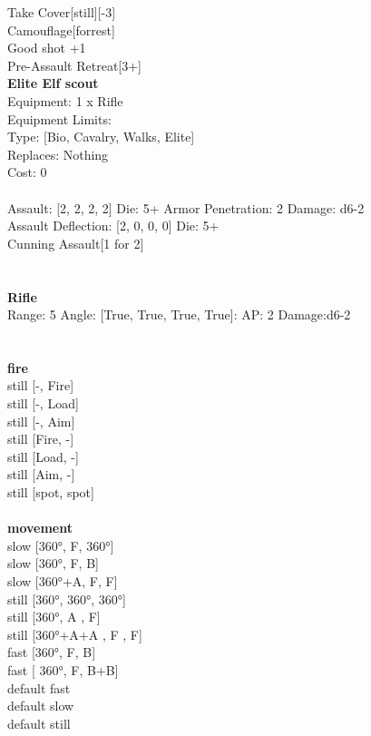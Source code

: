\noindent Take Cover[still][-3]\\ 
Camouflage[forrest]\\ 
Good shot +1\\ 
Pre-Assault Retreat[3+]\\ 


{\bf Elite Elf scout } \\
Equipment: 1 x Rifle \\
Equipment Limits:  \\
Type: [Bio, Cavalry, Walks, Elite] \\
Replaces: Nothing \\
Cost: 0\\
\ \\
Assault: [2, 2, 2, 2] Die: 5+ Armor Penetration: 2 Damage: d6-2 \\
Assault Deflection: [2, 0, 0, 0] Die: 5+\\
\indent Cunning Assault[1 for 2]\\ 
 
\ \\

\ \\
{\bf Rifle } \\



Range: 5  Angle: [True, True, True, True]: AP: 2 Damage:d6-2 \\




 
\ \\



\ \\ {\bf fire } \\
still [-, Fire] \\
still [-, Load] \\
still [-, Aim] \\
still [Fire, -] \\
still [Load, -] \\
still [Aim, -] \\
still [spot, spot] \\
\ \\ {\bf movement } \\
slow [360°, F, 360°] \\
slow [360°, F, B] \\
slow [360°+A, F, F] \\
still [360°, 360°, 360°] \\
still [360°, A , F] \\
still [360°+A+A , F , F] \\
fast [360°, F, B] \\
fast [ 360°,  F, B+B] \\
default fast \\
default slow \\
default still \\


